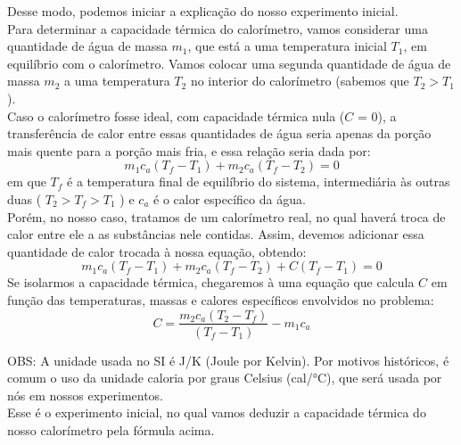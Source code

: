 Desse modo, podemos iniciar a explicação do nosso experimento inicial.\\

Para determinar a capacidade térmica do calorímetro, vamos considerar uma quantidade de água de massa $m_1$, que está a uma temperatura inicial $T_1$, em equilíbrio com o calorímetro. Vamos colocar uma segunda quantidade de água de massa $m_2$ a uma temperatura $T_2$ no interior do calorímetro (sabemos que $T_2 > T_1$).\\

Caso o calorímetro fosse ideal, com capacidade térmica nula ($C$ = 0), a transferência de calor entre essas quantidades de água seria apenas da porção mais quente para a porção mais fria, e essa relação seria dada por:
\[m_1 c_a(T_f - T_1) + m_2 c_a(T_f - T_2) = 0 \]
em que $T_f$ é a temperatura final de equilíbrio do sistema, intermediária às outras duas ( $T_2 > T_f > T_1$ ) e $c_a$ é o calor específico da água.\\

Porém, no nosso caso, tratamos de um calorímetro real, no qual haverá troca de calor entre ele a as substâncias nele contidas. Assim, devemos adicionar essa quantidade de calor trocada à nossa equação, obtendo: 
\[m_1 c_a(T_f - T_1) + m_2 c_a(T_f - T_2) + C (T_f - T_1) = 0 \]
Se isolarmos a capacidade térmica, chegaremos à uma equação que calcula $C$ em função das temperaturas, massas e calores específicos envolvidos no problema:
\[C =  \frac{m_2 c_a (T_2 - T_f) }{(T_f - T_1)} - m_1 c_a \]

OBS: A unidade usada no SI é J/K (Joule por Kelvin). Por motivos históricos, é comum o uso da unidade caloria por graus Celsius (cal/°C), que será usada por nós em nossos experimentos.\\

Esse é o experimento inicial, no qual vamos deduzir a capacidade térmica do nosso calorímetro pela fórmula acima.
